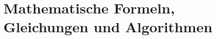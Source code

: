 \chapter[Mathem.\ Formeln etc.]{Mathematische Formeln, Gleichungen und Algorithmen}
\label{cha:Mathematik}

